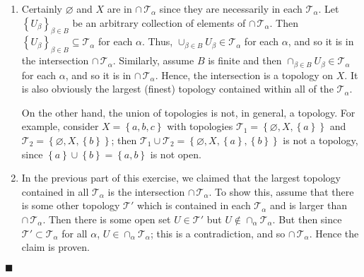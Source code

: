 \documentclass[12pt]{article}
\renewcommand{\qed}{\hfill$\blacksquare$}
\renewenvironment{proof}{\begin{addmargin}[1em]{0em}\begin{newproof}}{\end{newproof}\end{addmargin}\qed}
\begin{document}
\begin{proof}
\begin{enumerate}[label=(\alph*)]
	\item Certainly $\varnothing$ and $X$ are in $\cap \, \mathcal{T}_{\alpha}$ since they are necessarily in each $\mathcal{T}_{\alpha}$. Let $\left\{U_{\beta}\right\}_{\beta \in B}$ be an arbitrary collection of elements of $\cap \, \mathcal{T}_{\alpha}$. Then $\left\{U_{\beta}\right\}_{\beta \in B} \subseteq \mathcal{T}_{\alpha}$ for each $\alpha$. Thus, $\cup_{\beta \in B} U_{\beta} \in \mathcal{T}_{\alpha}$ for each $\alpha$, and so it is in the intersection $\cap\, \mathcal{T}_{\alpha}$. Similarly, assume $B$ is finite and then $\cap_{\beta \in B} U_{\beta} \in \mathcal{T}_{\alpha}$ for each $\alpha$, and so it is in $\cap\, \mathcal{T}_{\alpha}$. Hence, the intersection is a topology on $X$. {\color{red}It is also obviously the largest (finest) topology contained within all of the $\mathcal{T}_{\alpha}$.}
	
	On the other hand, the union of topologies is not, in general, a topology. For example, consider $X=\left\{a,b,c\right\}$ with topologies $\mathcal{T}_1 = \left\{\varnothing, X, \left\{a\right\}\right\}$ and $\mathcal{T}_2 = \left\{\varnothing, X, \left\{b\right\}\right\}$; then $\mathcal{T}_1 \cup \mathcal{T}_2 = \left\{\varnothing, X, \left\{a\right\}, \left\{b\right\}\right\}$ is not a topology, since $\left\{a\right\}\cup\left\{b\right\} = \left\{a,b\right\} $ is not open.
	
	\item In the previous part of this exercise, we claimed that the largest topology contained in all $\mathcal{T}_{\alpha}$ is the intersection $\cap \, \mathcal{T}_{\alpha}$. To show this, assume that there is some other topology $\mathcal{T}'$ which is contained in each $\mathcal{T}_{\alpha}$ and is larger than $\cap \,\mathcal{T}_{\alpha}$. Then there is some open set $U \in \mathcal{T}' $ but $U \notin \cap_{\alpha} \mathcal{T}_{\alpha}$. But then since $\mathcal{T}' \subset \mathcal{T}_{\alpha}$ for all $\alpha$, $U \in \cap_{\alpha} \mathcal{T}_{\alpha}$; this is a contradiction, and so $\cap \, \mathcal{T}_{\alpha}$. Hence the claim is proven. 
	

\end{enumerate}
\end{proof}
\end{document}
